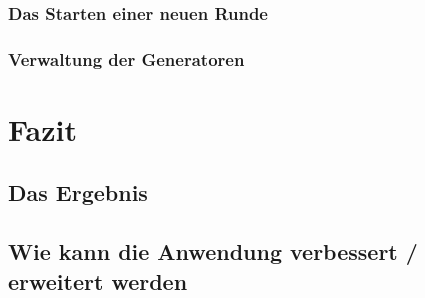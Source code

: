 \subsection{Das Starten einer neuen Runde}

\subsection{Verwaltung der Generatoren}



\chapter{Fazit}

\section{Das Ergebnis}

\section{Wie kann die Anwendung verbessert / erweitert werden}


